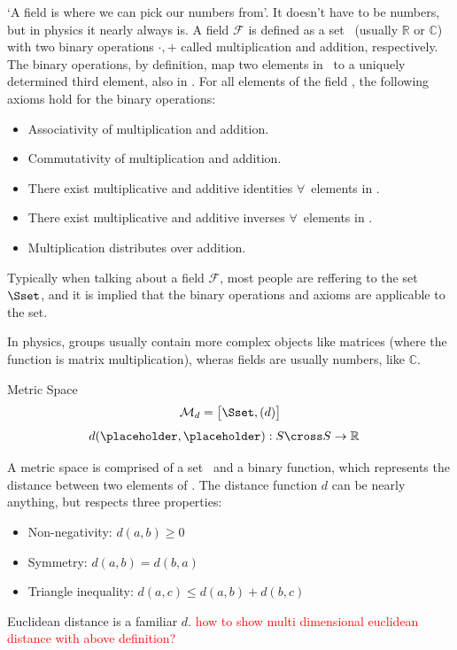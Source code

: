 	`A field is where we can pick our numbers from'. It doesn't have to be numbers, but in physics it nearly always is. A field \(\mathcal{F}\) is defined as a set \Sset\ (usually \(\mathbb{R}\) or \(\mathbb{C}\)) with two binary operations \(\cdot,+\) called multiplication and addition, respectively.
	The binary operations, by definition, map two elements in \Sset\ to a uniquely determined third element, also in \Sset. For all elements of the field \Fset, the following axioms hold for the binary operations:
	\begin{itemize}
		\item Associativity of multiplication and addition.
		\item Commutativity of multiplication and addition.
		\item There exist multiplicative and additive identities \(\forall\)\ elements in \Fset.
		\item There exist multiplicative and additive inverses \(\forall\)\ elements in \Fset.
		\item Multiplication distributes over addition.
	\end{itemize}

Typically when talking about a field \(\mathcal{F}\), most people are reffering to the set \(\Sset\), and it is implied that the binary operations and axioms are applicable to the set. 

In physics, groups usually contain more complex objects like matrices (where the function is matrix multiplication), wheras fields are usually numbers, like \(\mathbb{C}\). 
\newpage
\begin{mathbox}{Metric Space}
	\begin{equation*}
		\mathcal{M}_d=\big[\Sset, (d)\big]
	\end{equation*}
	\begin{align*}
	d(\placeholder,\placeholder):S\cross S&\rightarrow \mathbb{R}
	\end{align*}
\end{mathbox}
A metric space is comprised of a set \Sset\ and a binary function, which represents the distance between two elements of \Sset. The distance function \(d\) can be nearly anything, but respects three properties:
\begin{itemize}
	\item Non-negativity: \(d(a,b)\geq0\)
	\item Symmetry: \(d(a,b)=d(b,a)\)
	\item Triangle inequality: \(d(a,c)\leq d(a,b)+d(b,c)\)
\end{itemize}
Euclidean distance is a familiar \(d\).
\textcolor{red}{how to show multi dimensional euclidean distance with above definition?}

